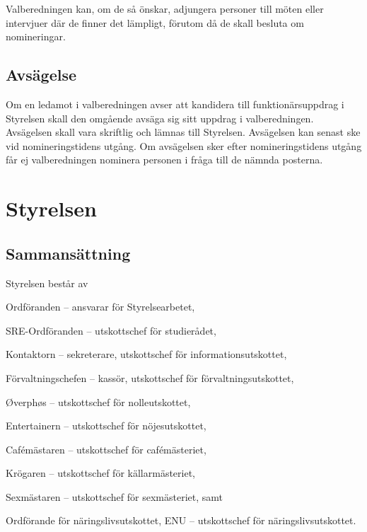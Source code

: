 \documentclass[10pt]{article}
\begin{document}
Valberedningen kan, om de så önskar, adjungera personer till möten eller
intervjuer där de finner det lämpligt, förutom då de skall besluta om
nomineringar.

\subsection{Avsägelse}

Om en ledamot i valberedningen avser att kandidera till funktionärsuppdrag
i Styrelsen skall den omgående avsäga sig sitt
uppdrag i valberedningen. Avsägelsen skall vara skriftlig och lämnas till
Styrelsen. Avsägelsen kan senast ske vid nomineringstidens
utgång. Om avsägelsen sker efter nomineringstidens utgång får ej
valberedningen nominera personen i fråga till de nämnda posterna.

\section{Styrelsen}

\subsection{Sammansättning}
Styrelsen består av
\begin{alphlist}
    \item Ordföranden -- ansvarar för Styrelsearbetet,
    \item SRE-Ordföranden -- utskottschef för studierådet,
    \item Kontaktorn -- sekreterare, utskottschef för informationsutskottet,
    \item Förvaltningschefen -- kassör, utskottschef för förvaltningsutskottet,
    \item Øverphøs -- utskottschef för nolleutskottet,
    \item Entertainern -- utskottschef för nöjesutskottet,
    \item Cafémästaren -- utskottschef för cafémästeriet,
    \item Krögaren -- utskottschef för källarmästeriet,
    \item Sexmästaren -- utskottschef för sexmästeriet, samt
    \item Ordförande för näringslivsutskottet, ENU
        -- utskottschef för näringslivsutskottet.
\end{alphlist}
\end{document}
